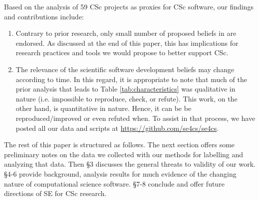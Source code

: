 \documentclass[conference,10pt]{IEEEtran}
\newcommand{\bi}{\begin{itemize}}
\newcommand{\be}{\begin{enumerate}}
\newcommand{\ee}{\end{enumerate}}
\begin{document}
Based on the analysis of 59 CSc projects as proxies for CSc software, our findings and contributions include: 
\be
\item Contrary to prior research, only small number of proposed beliefs in \cite{johan18_secs} are endorsed. As discussed at the end of this paper, this has implications for research practices and tools we would propose to better support CSc. 
\item The relevance of the scientific software development beliefs may change according to time.
In this regard, it is appropriate to note that
  much of the prior analysis that leads to Table \ref{tab:characteristics} was qualitative in nature (i.e. impossible to reproduce, check, or refute). This work, on the other hand, is quantitative in nature. Hence, it can be be reproduced/improved or even refuted when.  To assist in that process,  we have posted all our data and scripts at
\url{https://github.com/se4cs/se4cs}. 
\ee

The rest of this paper is structured as follows.
The next section offers some preliminary notes on the data
we collected with our methods for labelling and analyzing
that data. Then \S3 discusses the general threats to validity of our work. \S4-6 provide background, analysis results for much evidence
of the changing nature of computational science software. \S7-8 conclude and offer future directions of SE for CSc research. 


\end{document}

